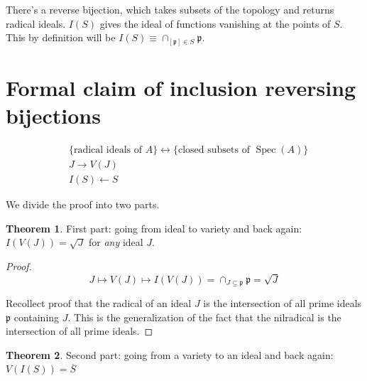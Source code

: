 \documentclass{book}
\newcommand{\spec}{\operatorname{Spec}}
\newcommand{\p}{\mathfrak{p}}
\theoremstyle{definition}
\newtheorem{theorem}{Theorem}
\begin{document}
There's a reverse bijection, which takes subsets of the topology and returns
radical ideals. $I(S)$ gives the ideal of functions vanishing at the points of $S$.
This by definition will be $I(S) \equiv \cap_{[\p] \in S} \p$.

\section{Formal claim of inclusion reversing bijections}

\begin{align*}
&\{ \text{radical ideals of $A$} \} \leftrightarrow \{ \text{closed subsets of $\spec(A)$} \} \\
&J \rightarrow V(J) \\
&I(S) \leftarrow S
\end{align*}

We divide the proof into two parts.

\begin{theorem}
First part: going from ideal to variety and back again:
$I(V(J)) = \sqrt{J}$ for \emph{any} ideal $J$.
\end{theorem}
\begin{proof}
$$
J \mapsto V(J) \mapsto I(V(J)) = \cap_{J \subseteq \p} \p = \sqrt{J}
$$

Recollect proof that the radical of an ideal $J$ is the intersection of all prime
ideals $\p$ containing $J$. This is the generalization of the fact that the
nilradical is the intersection of all prime ideals.
\end{proof}

\begin{theorem}
Second part: going from a variety to an ideal and back again:
$V(I(S)) = \overline{S}$
\end{theorem}
\end{document}
